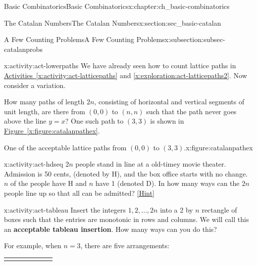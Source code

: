 \documentclass[oneside,10pt,]{book}
\newcommand{\terminology}[1]{\textbf{#1}}
\numberwithin{equation}{chapter}
\newcommand{\hrulethin}  {\noalign{\hrule height 0.04em}}
\begin{document}
\begin{chapterptx}{Basic Combinatorics}{}{Basic Combinatorics}{}{}{x:chapter:ch_basic-combinatorics}
\begin{sectionptx}{The Catalan Numbers}{}{The Catalan Numbers}{}{}{x:section:sec_basic-catalan}
\begin{subsectionptx}{A Few Counting Problems}{}{A Few Counting Problems}{}{}{x:subsection:subsec-catalanprobs}
\begin{activity}{}{x:activity:act-lowerpaths}
We have already seen how to count lattice paths in \hyperref[x:activity:act-latticepaths]{Activities~\ref{x:activity:act-latticepaths}} and \hyperref[x:exploration:act-latticepaths2]{\ref{x:exploration:act-latticepaths2}}.  Now consider a variation.%
\par
How many paths of length \(2n\), consisting of horizontal and vertical segments of unit length, are there from \((0, 0)\) to \((n, n)\) such that the path never goes above the line \(y = x\)? One such path to \((3, 3)\) is shown in \hyperref[x:figure:catalanpathex]{Figure~\ref{x:figure:catalanpathex}}.%
\begin{figureptx}{One of the acceptable lattice paths from \((0,0)\) to \((3,3)\).}{x:figure:catalanpathex}%
\begin{image}{0.25}{0.5}{0.25}%
%
\end{image}%
\tcblower
\end{figureptx}%
\end{activity}
\begin{activity}{}{x:activity:act-hdseq}%
\(2n\) people stand in line at a old-timey movie theater. Admission is 50 cents, (denoted by H), and the box office starts with no change. \(n\) of the people have H and \(n\) have \textdollar{}1 (denoted D). In how many ways can the \(2n\) people line up so that all can be admitted?%
\space\hspace*{0pt}\hfill{\tiny\hyperlink{g:hint:idm3576-back}{[Hint]}}\end{activity}
\begin{activity}{}{x:activity:act-tableau}%
Insert the integers \(1, 2, \ldots, 2n\) into a 2 by \(n\) rectangle of boxes such that the entries are monotonic in rows and columns.  We will call this an \terminology{acceptable tableau insertion}. How many ways can you do this?%
\par
For example, when \(n=3\), there are five arrangements:%
\begin{sidebyside}{5}{0}{0}{0}%
\begin{sbspanel}{0.2}%
{\centering%
\begin{tabular}{AcAcAcA}\hrulethin

\end{tabular}}
\end{sbspanel}
\end{sidebyside}
\end{activity}
\end{subsectionptx}
\end{sectionptx}
\end{chapterptx}
\end{document}
